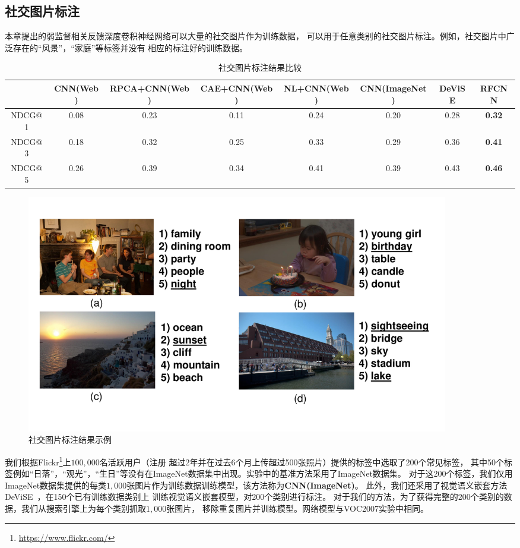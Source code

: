 \documentclass[doctor]{ustcthesis}
\begin{document}
\subsection{社交图片标注}
本章提出的弱监督相关反馈深度卷积神经网络可以大量的社交图片作为训练数据，
可以用于任意类别的社交图片标注。例如，社交图片中广泛存在的``风景''，``家庭''等标签并没有
相应的标注好的训练数据。

\begin{table}[tbp]
    \centering
    \caption{社交图片标注结果比较} \label{tab:rl-social-tagging-comp}
    \footnotesize
    \tabcolsep=0.3mm
    \begin{tabular}{|c|c|c|c|c|c|c|c|}
        \hline
        & CNN(Web) & RPCA+CNN(Web) & CAE+CNN(Web) & NL+CNN(Web) & CNN(ImageNet) &
        DeViSE & RFCNN\\
        \hline
        NDCG@1 & 0.08 & 0.23 & 0.11 & 0.24 & 0.20 & 0.28 & \textbf{0.32}\\
        \hline
        NDCG@3 & 0.18 & 0.32 & 0.25 & 0.33 & 0.29 & 0.36 & \textbf{0.41}\\
        \hline
        NDCG@5 & 0.26 & 0.39 & 0.34 & 0.41 & 0.39 & 0.43 & \textbf{0.46}\\
        \hline
    \end{tabular}
\end{table}

\begin{figure}[t]
    \center
    \includegraphics[clip=true, width=0.9\textwidth]{rf-cnn-tagging}
    \caption{社交图片标注结果示例}
    \label{fig:rf-cnn-tagging}
\end{figure}
我们根据Flickr\footnote{\url{https://www.flickr.com/}}上$100,000$名活跃用户（注册
超过2年并在过去6个月上传超过500张照片）提供的标签中选取了200个常见标签，
其中50个标签例如``日落''，``观光''，``生日''等没有在ImageNet数据集中出现。实验中的基准方法采用了ImageNet数据集。
对于这200个标签，我们仅用ImageNet数据集提供的每类$1,000$张图片作为训练数据训练模型，该方法称为\textbf{CNN(ImageNet)}。
此外，我们还采用了视觉语义嵌套方法DeViSE~\cite{frome2013devise}，在150个已有训练数据类别上
训练视觉语义嵌套模型，对200个类别进行标注。
对于我们的方法，为了获得完整的200个类别的数据，我们从搜索引擎上为每个类别抓取$1,000$张图片，
移除重复图片并训练模型。网络模型与VOC2007实验中相同。
\end{document}
